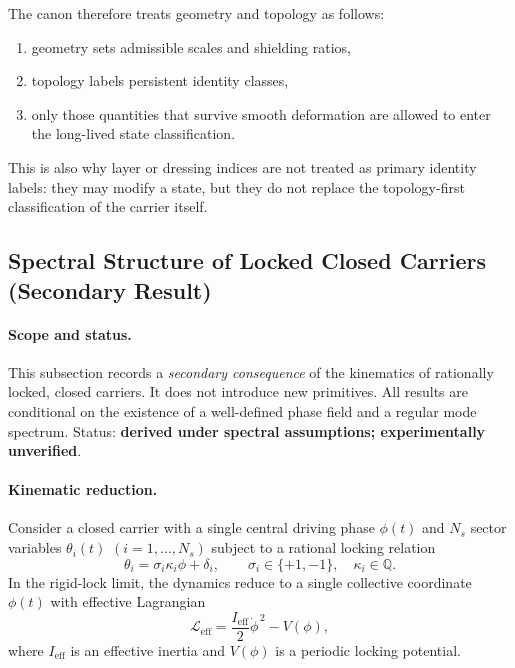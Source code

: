\documentclass[11pt]{article}
\theoremstyle{definition}
\theoremstyle{plain}
\theoremstyle{remark}
\begin{document}
        The canon therefore treats geometry and topology as follows:
        \begin{enumerate}
            \item geometry sets admissible scales and shielding ratios,
            \item topology labels persistent identity classes,
            \item only those quantities that survive smooth deformation are allowed to enter the long-lived state classification.
        \end{enumerate}

        This is also why layer or dressing indices are not treated as primary identity labels: they may modify a state, but they do not replace the topology-first classification of the carrier itself.

\subsection{Spectral Structure of Locked Closed Carriers (Secondary Result)}
    \label{subsec:spectral_locked_carriers}
    
    \paragraph{Scope and status.}
        This subsection records a \emph{secondary consequence} of the kinematics of rationally locked, closed carriers. It does not introduce new primitives. All results are conditional on the existence of a well-defined phase field and a regular mode spectrum. Status: \textbf{derived under spectral assumptions; experimentally unverified}.

    \paragraph{Kinematic reduction.}
        Consider a closed carrier with a single central driving phase $\phi(t)$ and $N_s$ sector variables $\theta_i(t)$ $(i=1,\dots,N_s)$ subject to a rational locking relation
        \begin{equation}
            \theta_i = \sigma_i \kappa_i \phi + \delta_i,
            \qquad
            \sigma_i \in \{+1,-1\},\quad \kappa_i \in \mathbb{Q}.
            \label{eq:locking_relation}
        \end{equation}
        In the rigid-lock limit, the dynamics reduce to a single collective coordinate $\phi(t)$ with effective Lagrangian
        \begin{equation}
            \mathcal{L}_{\mathrm{eff}}
            =
            \frac{I_{\mathrm{eff}}}{2}\dot{\phi}^{\,2}
            -
            V(\phi),
            \label{eq:Leff_canonical}
        \end{equation}
        where $I_{\mathrm{eff}}$ is an effective inertia and $V(\phi)$ is a periodic locking potential.
\end{document}
